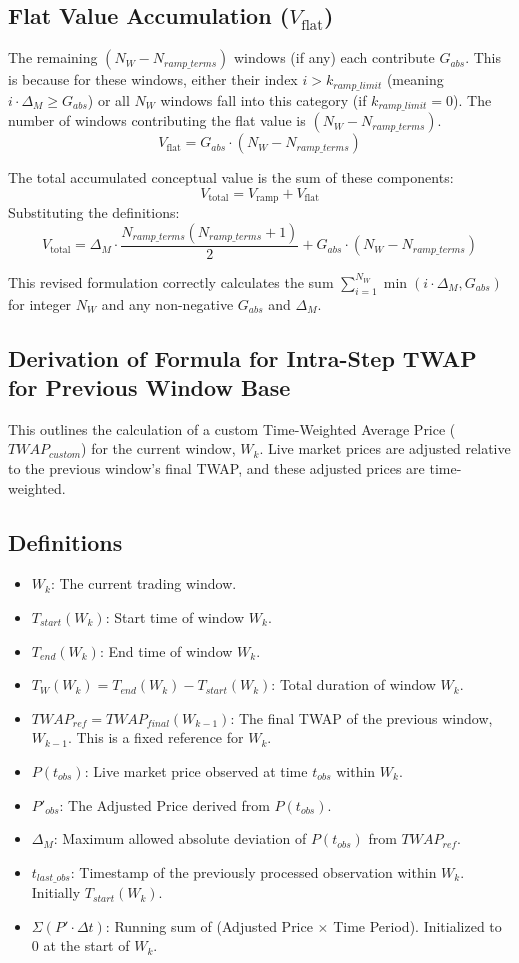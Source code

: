 \documentclass{article}
\begin{document}
\subsection*{Flat Value Accumulation ($V_{\text{flat}}$)}
The remaining $(N_W - N_{ramp\_terms})$ windows (if any) each contribute $G_{abs}$. This is because for these windows, either their index $i > k_{ramp\_limit}$ (meaning $i \cdot \Delta_M \ge G_{abs}$) or all $N_W$ windows fall into this category (if $k_{ramp\_limit}=0$).
The number of windows contributing the flat value is $(N_W - N_{ramp\_terms})$.
\[ V_{\text{flat}} = G_{abs} \cdot (N_W - N_{ramp\_terms}) \]

The total accumulated conceptual value is the sum of these components:
\[ V_{\text{total}} = V_{\text{ramp}} + V_{\text{flat}} \]
Substituting the definitions:
\[ V_{\text{total}} = \Delta_M \cdot \frac{N_{ramp\_terms}(N_{ramp\_terms}+1)}{2} + G_{abs} \cdot (N_W - N_{ramp\_terms}) \]

This revised formulation correctly calculates the sum $\sum_{i=1}^{N_W} \min(i \cdot \Delta_M, G_{abs})$ for integer $N_W$ and any non-negative $G_{abs}$ and $\Delta_M$.

\subsection{Derivation of Formula for Intra-Step TWAP for Previous Window Base}
This outlines the calculation of a custom Time-Weighted Average Price ($TWAP_{custom}$) for the current window, $W_k$. Live market prices are adjusted relative to the previous window's final TWAP, and these adjusted prices are time-weighted.

\subsection*{Definitions}
\begin{itemize}
    \item $W_k$: The current trading window.
    \item $T_{start}(W_k)$: Start time of window $W_k$.
    \item $T_{end}(W_k)$: End time of window $W_k$.
    \item $T_W(W_k) = T_{end}(W_k) - T_{start}(W_k)$: Total duration of window $W_k$.
    \item $TWAP_{ref} = TWAP_{final}(W_{k-1})$: The final TWAP of the previous window, $W_{k-1}$. This is a fixed reference for $W_k$.
    \item $P(t_{obs})$: Live market price observed at time $t_{obs}$ within $W_k$.
    \item $P'_{obs}$: The Adjusted Price derived from $P(t_{obs})$.
    \item $\Delta_M$: Maximum allowed absolute deviation of $P(t_{obs})$ from $TWAP_{ref}$.
    \item $t_{last\_obs}$: Timestamp of the previously processed observation within $W_k$. Initially $T_{start}(W_k)$.
    \item $\Sigma (P' \cdot \Delta t)$: Running sum of (Adjusted Price $\times$ Time Period). Initialized to 0 at the start of $W_k$.
\end{itemize}
\end{document}
